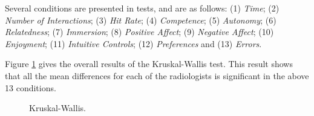 \documentclass{sigchi}
\begin{document}
Several conditions are presented in tests, and are as follows: (1) \textit{Time}; (2) \textit{Number of Interactions}; (3) \textit{Hit Rate}; (4) \textit{Competence}; (5) \textit{Autonomy}; (6) \textit{Relatedness}; (7) \textit{Immersion}; (8) \textit{Positive Affect}; (9) \textit{Negative Affect}; (10) \textit{Enjoyment}; (11) \textit{Intuitive Controls}; (12) \textit{Preferences} and (13) \textit{Errors}.

Figure \ref{fig:Fig8}  gives the overall results of the Kruskal-Wallis test. This result shows that all the mean differences for each of the radiologists is significant in the above 13 conditions.

\begin{figure}
\caption{Kruskal-Wallis.}
\label{fig:Fig8}
\end{figure}
\end{document}
